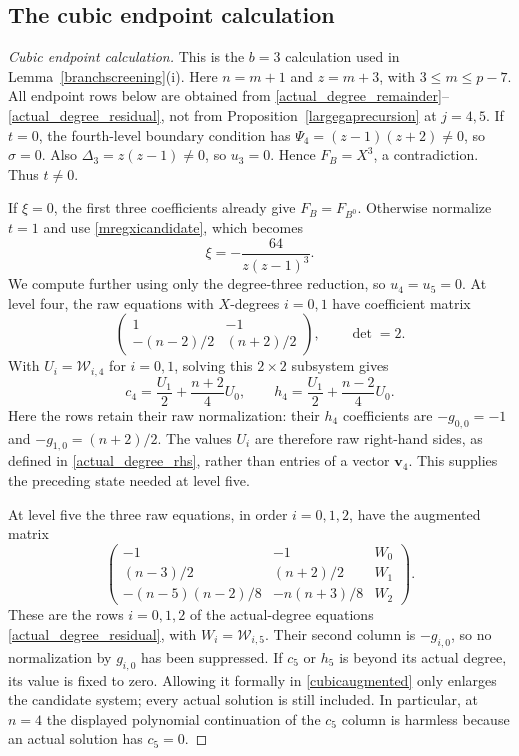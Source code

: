 \documentclass[12pt]{article}
\theoremstyle{remark}
\begin{document}
\subsection{The cubic endpoint calculation}\label{app:cubic}

\begin{proof}[Cubic endpoint calculation]
This is the $b=3$ calculation used in
Lemma~\ref{branchscreening}(i).  Here $n=m+1$ and $z=m+3$, with
$3\le m\le p-7$.  All endpoint rows below are obtained from
\eqref{actual_degree_remainder}--\eqref{actual_degree_residual}, not
from Proposition~\ref{largegaprecursion} at $j=4,5$.
If $t=0$, the fourth-level boundary condition has
$\Psi_4=(z-1)(z+2)\ne0$, so $\sigma=0$.
Also $\Delta_3=z(z-1)\ne0$, so $u_3=0$.  Hence $F_B=X^3$, a
contradiction.  Thus $t\ne0$.

If $\xi=0$, the first three coefficients already give
$F_B=F_{B^0}$.  Otherwise normalize $t=1$ and use
\eqref{mregxicandidate}, which becomes
\begin{equation}\label{cubicxicandidate}
 \xi=-\frac{64}{z(z-1)^3}.
\end{equation}
We compute further using only the degree-three reduction, so
$u_4=u_5=0$.  At level four, the raw equations with $X$-degrees $i=0,1$ have
coefficient matrix
\[
 \begin{pmatrix}1&-1\\-(n-2)/2&(n+2)/2\end{pmatrix},
 \qquad \det=2.
\]
With $U_i=\mathcal W_{i,4}$ for $i=0,1$, solving this
$2\times2$ subsystem gives
\[
 c_4=\frac{U_1}{2}+\frac{n+2}{4}U_0,\qquad
 h_4=\frac{U_1}{2}+\frac{n-2}{4}U_0.
\]
Here the rows retain their raw normalization: their $h_4$
coefficients are $-g_{0,0}=-1$ and $-g_{1,0}=(n+2)/2$.
The values $U_i$ are therefore raw right-hand sides, as defined in
\eqref{actual_degree_rhs}, rather than entries of a vector $\mathbf v_4$.
This supplies the preceding state needed at level five.

At level five the three raw equations, in order $i=0,1,2$, have the
augmented matrix
\begin{equation}\label{cubicaugmented}
 \begin{pmatrix}
 -1&-1&W_0\\[1mm]
 (n-3)/2&(n+2)/2&W_1\\[1mm]
 -(n-5)(n-2)/8&-n(n+3)/8&W_2
 \end{pmatrix}.
\end{equation}
These are the rows $i=0,1,2$ of the actual-degree equations
\eqref{actual_degree_residual}, with $W_i=\mathcal W_{i,5}$.
Their second column is $-g_{i,0}$, so no normalization by $g_{i,0}$
has been suppressed.  If $c_5$ or $h_5$ is beyond its actual degree,
its value is fixed to zero.  Allowing it formally in
\eqref{cubicaugmented} only enlarges the candidate system; every actual
solution is still included.  In particular, at $n=4$ the displayed
polynomial continuation of the $c_5$ column is harmless because an
actual solution has $c_5=0$.


\end{proof}
\end{document}

